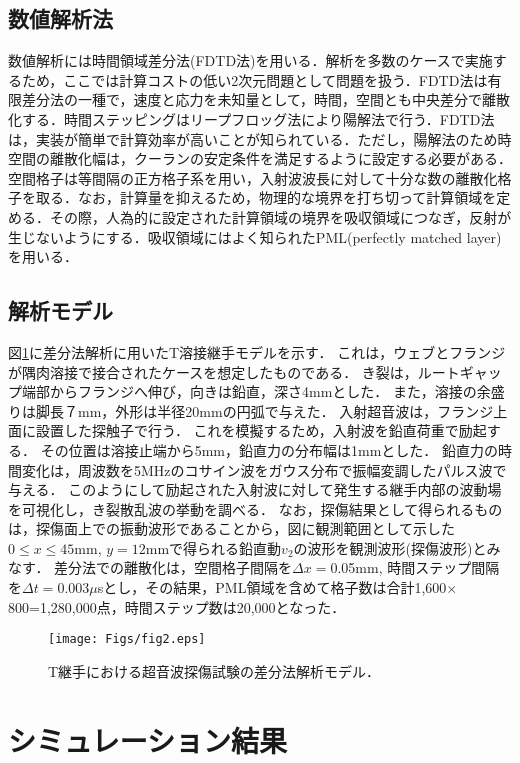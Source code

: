 \documentclass{jsce}
\begin{document}
\subsection{数値解析法}
数値解析には時間領域差分法(FDTD法)を用いる．解析を多数のケースで実施するため，ここでは計算コストの低い2次元問題として問題を扱う．FDTD法は有限差分法の一種で，速度と応力を未知量として，時間，空間とも中央差分で離散化する．時間ステッピングはリープフロッグ法により陽解法で行う．FDTD法は，実装が簡単で計算効率が高いことが知られている．ただし，陽解法のため時空間の離散化幅は，クーランの安定条件を満足するように設定する必要がある．空間格子は等間隔の正方格子系を用い，入射波波長に対して十分な数の離散化格子を取る．なお，計算量を抑えるため，物理的な境界を打ち切って計算領域を定める．その際，人為的に設定された計算領域の境界を吸収領域につなぎ，反射が生じないようにする．吸収領域にはよく知られたPML(perfectly matched layer)を用いる．
\subsection{解析モデル}
図\ref{fig:fig2}に差分法解析に用いたT溶接継手モデルを示す．
これは，ウェブとフランジが隅肉溶接で接合されたケースを想定したものである．
き裂は，ルートギャップ端部からフランジへ伸び，向きは鉛直，深さ4mmとした．
また，溶接の余盛りは脚長７mm，外形は半径20mmの円弧で与えた．
入射超音波は，フランジ上面に設置した探触子で行う．
これを模擬するため，入射波を鉛直荷重で励起する．
その位置は溶接止端から5mm，鉛直力の分布幅は1mmとした．
鉛直力の時間変化は，周波数を5MHzのコサイン波をガウス分布で振幅変調したパルス波で与える．
このようにして励起された入射波に対して発生する継手内部の波動場を可視化し，き裂散乱波の挙動を調べる．
なお，探傷結果として得られるものは，探傷面上での振動波形であることから，図に観測範囲として示した$0\leq x\leq 45$mm, $y=12$mmで得られる鉛直動$v_2$の波形を観測波形(探傷波形)とみなす．
差分法での離散化は，空間格子間隔を$\Delta x=$0.05mm, 時間ステップ間隔を$\Delta t=$0.003$\mu$sとし，その結果，PML領域を含めて格子数は合計1,600$\times$800=1,280,000点，時間ステップ数は20,000となった．
\begin{figure}[h]
	\begin{center}
	\texttt{[image: Figs/fig2.eps]} 
	\end{center}
	\caption{
		T継手における超音波探傷試験の差分法解析モデル．
	} 
	\label{fig:fig2}
\end{figure}
\section{シミュレーション結果}
\end{document}
